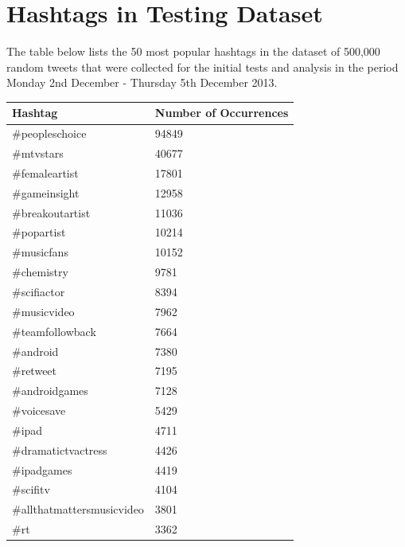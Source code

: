 \documentclass[12pt,a4paper]{article}
\begin{document}
\section{Hashtags in Testing Dataset}
\label{appendix:hashtags}
The table below lists the 50 most popular hashtags in the dataset of 500,000 random tweets that were collected for the initial tests and analysis in the period Monday 2nd December - Thursday 5th December 2013.
\begin{longtable}{| l | l |}
    \hline
    \textbf{Hashtag} & \textbf{Number of Occurrences} \\
    \hline \hline
    \#peopleschoice             &   94849   \\ \hline
    \#mtvstars                  &   40677   \\ \hline
    \#femaleartist              &   17801   \\ \hline
    \#gameinsight               &   12958   \\ \hline
    \#breakoutartist            &   11036   \\ \hline
    \#popartist                 &   10214   \\ \hline
    \#musicfans                 &   10152   \\ \hline
    \#chemistry                 &   9781    \\ \hline
    \#scifiactor                &   8394    \\ \hline
    \#musicvideo                &   7962    \\ \hline
    \#teamfollowback            &   7664    \\ \hline
    \#android                   &   7380    \\ \hline
    \#retweet                   &   7195    \\ \hline
    \#androidgames              &   7128    \\ \hline
    \#voicesave                 &   5429    \\ \hline
    \#ipad                      &   4711    \\ \hline
    \#dramatictvactress         &   4426    \\ \hline
    \#ipadgames                 &   4419    \\ \hline
    \#scifitv                   &   4104    \\ \hline
    \#allthatmattersmusicvideo  &   3801    \\ \hline
    \#rt                        &   3362    \\ \hline

\end{longtable}
\end{document}
